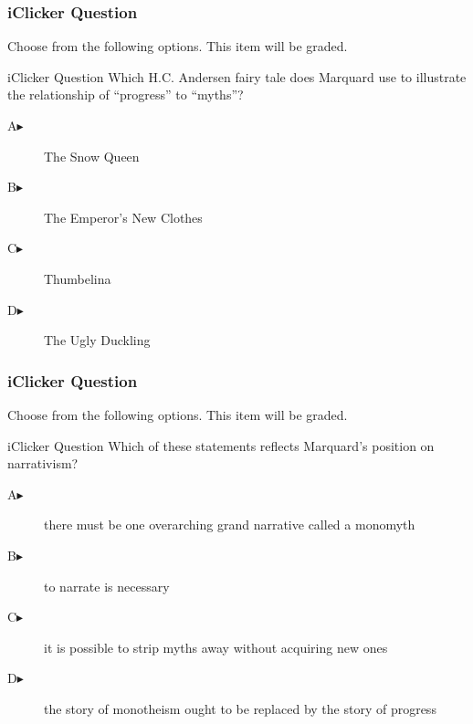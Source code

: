 \documentclass[xcolor=dvipsnames]{beamer}
\begin{document}
\begin{frame}
  \frametitle{iClicker Question}
Choose from the following options. This item will be graded.
\begin{block}{iClicker Question}
Which H.C. Andersen fairy tale does Marquard use to illustrate the
relationship of ``progress'' to ``myths''?
\end{block}
\begin{description}
\item[A\hspace{.2in}$\blacktriangleright$] The Snow Queen
\item[B\hspace{.2in}$\blacktriangleright$] The Emperor's New Clothes
\item[C\hspace{.2in}$\blacktriangleright$] Thumbelina
\item[D\hspace{.2in}$\blacktriangleright$] The Ugly Duckling
\end{description}
\end{frame}

\begin{frame}
  \frametitle{iClicker Question}
Choose from the following options. This item will be graded.
\begin{block}{iClicker Question}
Which of these statements reflects Marquard's position on narrativism?
\end{block}
\begin{description}
\item[A\hspace{.2in}$\blacktriangleright$] there must be one
  overarching grand narrative called a monomyth
\item[B\hspace{.2in}$\blacktriangleright$] to narrate is necessary
\item[C\hspace{.2in}$\blacktriangleright$] it is possible to strip
  myths away without acquiring new ones
\item[D\hspace{.2in}$\blacktriangleright$] the story of monotheism
  ought to be replaced by the story of progress
\end{description}
\end{frame}
\end{document}
